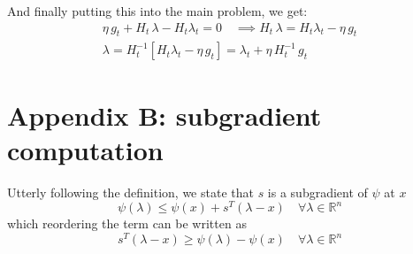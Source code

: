 \documentclass[notitlepage]{article}
\begin{document}
And finally putting this into the main problem, we get:
\begin{gather*}
  \eta\, g_t + H_t\, \lambda - H_t \lambda_t = 0 \quad \implies H_t\, \lambda = H_t \lambda_t - \eta\, g_t \\
  \lambda = H_t^{-1} \left[ H_t \lambda_t - \eta\, g_t \right] = \lambda_t + \eta\, H_t^{-1}\, g_t
\end{gather*}


\section{Appendix B: subgradient computation}
\label{sec:appendix_B}

Utterly following the definition, we state that $s$ is a subgradient of $\psi$ at $x$
\[
  \psi( \lambda ) \le \psi(x) + s^T (\lambda - x) \quad \forall \lambda \in \mathbb{R}^n  
\]
which reordering the term can be written as
\[
  s^T (\lambda - x) \ge \psi(\lambda) - \psi(x) \quad \forall \lambda \in \mathbb{R}^n  
\]
\end{document}
